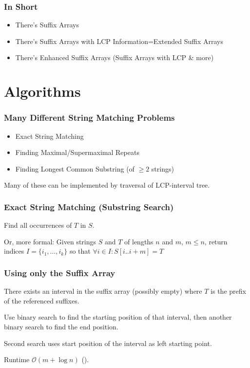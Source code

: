 \documentclass[compress,handout]{beamer} %
\renewcommand{\O}{\mathcal{O}}
\begin{document}
\begin{frame}
	\frametitle{In Short}
	\begin{itemize}
		\item There's Suffix Arrays
		\item There's Suffix Arrays with LCP Information=Extended Suffix Arrays
		\item There's Enhanced Suffix Arrays (Suffix Arrays with LCP \& more)
	\end{itemize}
\end{frame}

\section{Algorithms}

\begin{frame}
	\frametitle{Many Different String Matching Problems}
	\begin{itemize}
		\item Exact String Matching
		\item Finding Maximal/Supermaximal Repeats
		\item Finding Longest Common Substring (of $\ge 2$ strings)
	\end{itemize}
	Many of these can be implemented by traversal of LCP-interval tree.
\end{frame}

\begin{frame}
	\frametitle{Exact String Matching (Substring Search)}
	Find all occurrences of $T$ in $S$.

	Or, more formal: Given strings $S$ and $T$ of lengths $n$ and
	$m$, $m \le n$, return indices $I=\{i_{1}, \ldots, i_{k}\}$
	so that $\forall i \in I: S[i..i+m]=T$
\end{frame}

\begin{frame}
	\frametitle{Using only the Suffix Array}
	There exists an interval in the suffix array (possibly empty)
	where $T$ is the prefix of the referenced suffixes.

	Use binary search to find the starting position of that interval,
	then another binary search to find the end position.

	Second search uses start position of the interval as left
	starting point.

	Runtime $\O(m + \log n)$ (\citealt{manber1993suffix}).
\end{frame}
\end{document}
